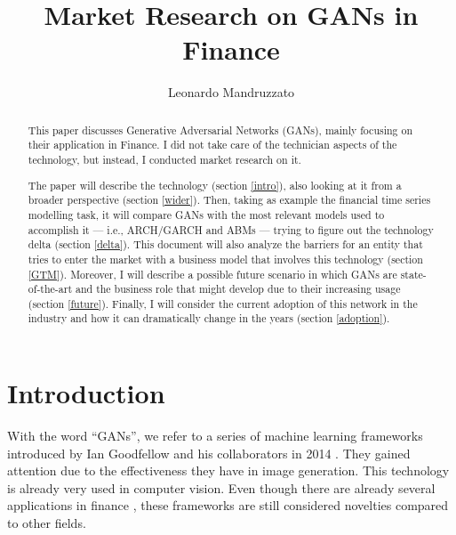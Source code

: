 \documentclass[runningheads]{llncs}
\begin{document}
%
\title{Market Research on GANs in Finance}
%
%
\author{Leonardo Mandruzzato}
%
%
%
\maketitle              %
%
\begin{abstract}
This paper discusses Generative Adversarial Networks (GANs), mainly focusing on their application in Finance. I did not take care of the technician aspects of the technology, but instead, I conducted market research on it.

The paper will describe the technology (section \ref{intro}), also looking at it from a broader perspective (section \ref{wider}). Then, taking as example the financial time series modelling task, it will compare GANs with the most relevant models used to accomplish it — i.e.,  ARCH/GARCH and ABMs  — trying to figure out the technology delta (section \ref{delta}). This document will also analyze the barriers for an entity that tries to enter the market with a business model that involves this technology (section \ref{GTM}). Moreover, I will describe a possible future scenario in which GANs are state-of-the-art and the business role that might develop due to their increasing usage (section \ref{future}). Finally, I will consider the current adoption of this network in the industry and how it can dramatically change in the years (section \ref{adoption}).

\end{abstract}
%
%
%
\section{Introduction}\label{intro}
With the word “GANs”, we refer to a series of machine learning frameworks introduced by Ian Goodfellow and his collaborators in 2014 \cite{goodfellow_2014}. 
They gained attention due to the effectiveness they have in image generation.  This technology is already very used in computer vision. Even though there are already several applications in finance \cite{eckerli_2021}, these frameworks are still considered novelties compared to other fields.
\end{document}
